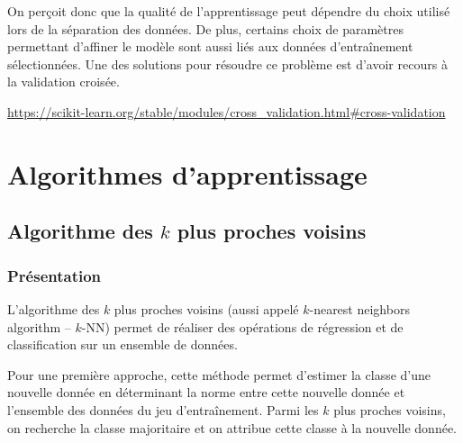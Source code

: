 {On perçoit donc que la qualité de l'apprentissage peut dépendre du choix utilisé lors de la séparation des données. De plus, certains choix de paramètres permettant d’affiner le modèle sont aussi liés aux données d’entraînement sélectionnées. 
Une des solutions pour résoudre ce problème est d'avoir recours à la validation croisée. 




\url{https://scikit-learn.org/stable/modules/cross_validation.html#cross-validation}




\section{Algorithmes d'apprentissage}

\subsection{Algorithme des $k$ plus proches voisins}
\subsubsection{Présentation}
L'algorithme des  $k$ plus proches voisins (aussi appelé $k$-nearest neighbors algorithm -- $k$-NN) permet de réaliser des opérations de régression et de classification sur un ensemble de données. 

Pour une première approche, cette méthode permet d'estimer la classe d'une nouvelle donnée en déterminant la norme entre cette nouvelle donnée et l'ensemble des données du jeu d’entraînement. Parmi les $k$ plus proches voisins, on recherche la classe majoritaire et on attribue cette classe à la nouvelle donnée.  

\begin{exemple}~\\


\end{exemple}}
